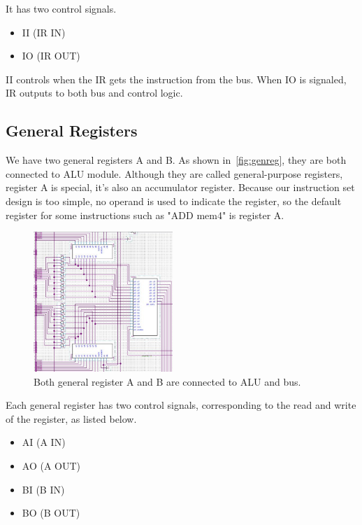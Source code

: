 It has two control signals.

\begin{itemize}
	\item II (IR IN)
	\item IO (IR OUT)
\end{itemize}

II controls when the IR gets the instruction from the bus. When IO is signaled, IR outputs to both bus and control logic.


\subsection{General Registers}

We have two general registers A and B. As shown in~\autoref{fig:genreg}, they are both connected to ALU module. Although they are called general-purpose registers, register A is special, it's also an accumulator register. Because our instruction set design is too simple, no operand is used to indicate the register, so the default register for some instructions such as "ADD mem4" is register A.
 
\begin{figure}[th]
	\includegraphics[width=0.47\textwidth]{figures/genreg}
	\centering
	\caption{Both general register A and B are connected to ALU and bus.}
	\label{fig:genreg}
\end{figure}

Each general register has two control signals, corresponding to the read and write of the register, as listed below.

\begin{itemize}
	\item AI (A IN)
	\item AO (A OUT)
	\item BI (B IN)
	\item BO (B OUT)
\end{itemize}




